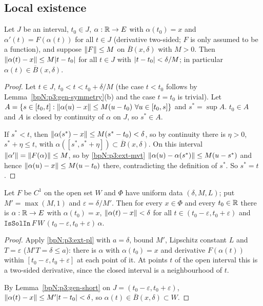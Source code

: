 \subsection{Local existence}\label{bpN:p3:s-exist}

\begin{lemma}\label{bpN:p3:gen-short}
Let $J$ be an interval, $t_0\in J$, $\alpha:\mathbb{R}\to E$ with $\alpha(t_0)=x$ and $\alpha'(t)=F(\alpha(t))$ for all $t\in J$
(derivative two-sided; $F$ is only assumed to be a function), and suppose $\lVert F\rVert\le M$ on $\overline B(x,\delta)$ with
$M>0$. Then $\lVert \alpha(t)-x\rVert\le M\lvert t-t_0\rvert$ for all $t\in J$ with $\lvert t-t_0\rvert<\delta/M$; in particular
$\alpha(t)\in\overline B(x,\delta)$.
\end{lemma}
\begin{proof}
\label{stepN:p3:short-boot} Let $t\in J$, $t_0<t<t_0+\delta/M$ (the case $t<t_0$ follows by Lemma~\ref{bpN:p3:gen-symmetry}(b) and the case $t=t_0$ is trivial).
Let $A=\{s\in[t_0,t]:\norm{\alpha(u)-x}\le M(u-t_0)\ \forall u\in[t_0,s]\}$ and $s^*=\sup A$. $t_0\in A$ and $A$ is closed by
continuity of $\alpha$ on $J$, so $s^*\in A$.

\label{stepN:p3:short-ext} If $s^*<t$, then $\lVert \alpha(s^*)-x\rVert\le M(s^*-t_0)<\delta$, so by continuity there is $\eta>0$, $s^*+\eta\le t$, with $\alpha([s^*,s^*+\eta])\subset\overline B(x,\delta)$. On this interval $\lVert \alpha'\rVert=\lVert F(\alpha)\rVert\le M$, so by
\ref{bpN:p3:ext-mvt} $\lVert \alpha(u)-\alpha(s^*)\rVert\le M(u-s^*)$ and hence $\lVert \alpha(u)-x\rVert\le M(u-t_0)$ there,
contradicting the definition of $s^*$. So $s^*=t$.
\end{proof}

\begin{proposition}\label{bpN:p3:gen-uniform-exist}
Let $F$ be $C^1$ on the open set $W$ and $\Phi$ have uniform data $(\delta,M,L)$; put $M'=\max(M,1)$ and
$\varepsilon=\delta/M'$. Then for every $x\in\Phi$ and every $t_0\in\mathbb{R}$ there is $\alpha:\mathbb{R}\to E$ with $\alpha(t_0)=x$,
$\lVert \alpha(t)-x\rVert<\delta$ for all $t\in(t_0-\varepsilon,t_0+\varepsilon)$ and
$\texttt{IsSolIn}\,F\,W\,(t_0-\varepsilon,t_0+\varepsilon)\,\alpha$.
\end{proposition}
\begin{proof}
\label{stepN:p3:ue-pl} Apply \ref{bpN:p3:ext-pl} with $a=\delta$, bound $M'$, Lipschitz constant $L$ and $T=\varepsilon$ ($M'T=\delta\le a$):
there is $\alpha$ with $\alpha(t_0)=x$ and derivative $F(\alpha(t))$ within $[t_0-\varepsilon,t_0+\varepsilon]$ at each point of it.
At points $t$ of the open interval this is a two-sided derivative, since the closed interval is a neighbourhood of $t$.

\label{stepN:p3:ue-stay} By Lemma~\ref{bpN:p3:gen-short} on $J=(t_0-\varepsilon,t_0+\varepsilon)$, $\lVert \alpha(t)-x\rVert\le M'\lvert t-t_0\rvert<\delta$, so $\alpha(t)\in\overline B(x,\delta)\subset W$.
\end{proof}

